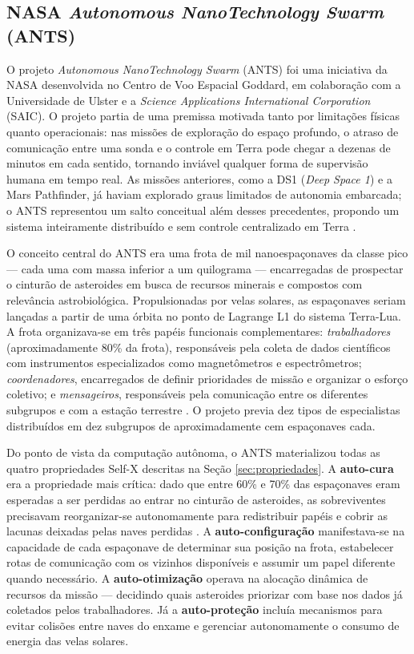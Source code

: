 \subsection{NASA \textit{Autonomous NanoTechnology Swarm} (ANTS)}

O projeto \textit{Autonomous NanoTechnology Swarm} (ANTS) foi uma iniciativa da NASA desenvolvida no Centro de Voo Espacial Goddard, em colaboração com a Universidade de Ulster e a \textit{Science Applications International Corporation} (SAIC). O projeto partia de uma premissa motivada tanto por limitações físicas quanto operacionais: nas missões de exploração do espaço profundo, o atraso de comunicação entre uma sonda e o controle em Terra pode chegar a dezenas de minutos em cada sentido, tornando inviável qualquer forma de supervisão humana em tempo real. As missões anteriores, como a DS1 (\textit{Deep Space 1}) e a Mars Pathfinder, já haviam explorado graus limitados de autonomia embarcada; o ANTS representou um salto conceitual além desses precedentes, propondo um sistema inteiramente distribuído e sem controle centralizado em Terra \cite{W1999392360, truszkowski2004}.

O conceito central do ANTS era uma frota de mil nanoespaçonaves da classe pico --- cada uma com massa inferior a um quilograma --- encarregadas de prospectar o cinturão de asteroides em busca de recursos minerais e compostos com relevância astrobiológica. Propulsionadas por velas solares, as espaçonaves seriam lançadas a partir de uma órbita no ponto de Lagrange L1 do sistema Terra-Lua. A frota organizava-se em três papéis funcionais complementares: \textit{trabalhadores} (aproximadamente 80\% da frota), responsáveis pela coleta de dados científicos com instrumentos especializados como magnetômetros e espectrômetros; \textit{coordenadores}, encarregados de definir prioridades de missão e organizar o esforço coletivo; e \textit{mensageiros}, responsáveis pela comunicação entre os diferentes subgrupos e com a estação terrestre \cite{truszkowski2004}. O projeto previa dez tipos de especialistas distribuídos em dez subgrupos de aproximadamente cem espaçonaves cada.

Do ponto de vista da computação autônoma, o ANTS materializou todas as quatro propriedades Self-X descritas na Seção \ref{sec:propriedades}. A \textbf{auto-cura} era a propriedade mais crítica: dado que entre 60\% e 70\% das espaçonaves eram esperadas a ser perdidas ao entrar no cinturão de asteroides, as sobreviventes precisavam reorganizar-se autonomamente para redistribuir papéis e cobrir as lacunas deixadas pelas naves perdidas \cite{W1999392360}. A \textbf{auto-configuração} manifestava-se na capacidade de cada espaçonave de determinar sua posição na frota, estabelecer rotas de comunicação com os vizinhos disponíveis e assumir um papel diferente quando necessário. A \textbf{auto-otimização} operava na alocação dinâmica de recursos da missão --- decidindo quais asteroides priorizar com base nos dados já coletados pelos trabalhadores. Já a \textbf{auto-proteção} incluía mecanismos para evitar colisões entre naves do enxame e gerenciar autonomamente o consumo de energia das velas solares.

